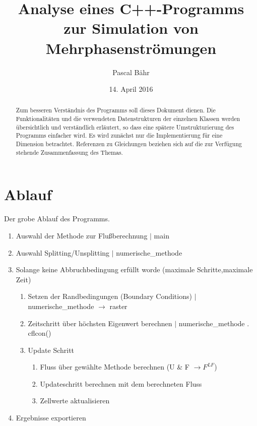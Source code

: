 \documentclass[12pt]{article}
\title{\vspace*{-10mm}Analyse eines C++-Programms\\ zur Simulation von Mehrphasenströmungen}
\author{
	Pascal Bähr
	}
\date{14. April 2016}
\begin{document}
\maketitle

\begin{abstract}
Zum besseren Verständnis des Programms soll dieses Dokument dienen. Die Funktionalitäten und die verwendeten Datenstrukturen der einzelnen Klassen werden übersichtlich und verständlich erläutert, so dass eine spätere Umstrukturierung des Programms einfacher wird. Es wird zunächst nur die Implementierung für eine Dimension betrachtet. Referenzen zu Gleichungen beziehen sich auf die zur Verfügung stehende Zusammenfassung des Themas.
\end{abstract}



\section{Ablauf}
Der grobe Ablauf des Programms.
\begin{enumerate}
	\item Auswahl der Methode zur Flußberechnung $|$ main
	\item Auswahl Splitting/Unsplitting $|$ numerische\_methode
	\item Solange keine Abbruchbedingung erfüllt worde (maximale Schritte,maximale Zeit)
	\begin{enumerate}
		\item Setzen der Randbedingungen (Boundary Conditions) $|$ numerische\_methode $\rightarrow$ raster
		\item Zeitschritt über höchsten Eigenwert berechnen $|$ numerische\_methode . cflcon()
		\item Update Schritt
		\begin{enumerate}
			\item Fluss über gewählte Methode berechnen (U \& F $\rightarrow F^{LF}$)
			\item Updateschritt berechnen mit dem berechneten Fluss
			\item Zellwerte aktualisieren
		\end{enumerate}	
	\end{enumerate}	
	\item Ergebnisse exportieren
\end{enumerate}	
\end{document}
